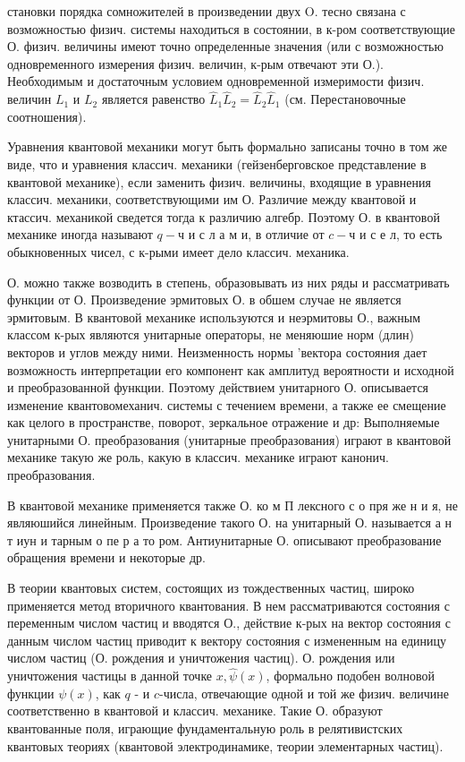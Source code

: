 \documentclass[10pt]{article}
\begin{document}
становки порядка сомножителей в произведении двух $\mathrm{O}$. тесно связана с возможностью физич. системы находиться в состоянии, в к-ром соответствующие О. физич. величины имеют точно определенные значения (или с возможностью одновременного измерения физич. величин, к-рым отвечают эти О.). Необходимым и достаточным условием одновременной измеримости физич. величин $L_{1}$ и $L_{2}$ является равенство $\hat{L}_{1} \hat{L}_{2}=\hat{L}_{2} \hat{L}_{1}$ (см. Перестановочные соотношения).



Уравнения квантовой механики могут быть формально записаны точно в том же виде, что и уравнения классич. механики (гейзенберговское представление в квантовой механике), если заменить физич. величины, входящие в уравнения классич. механики, соответствующими им О. Различие между квантовой и ктассич. механикой сведется тогда к различию алгебр. Поэтому О. в квантовой механике иногда называют $q-ч$ и с л а м и, в отличие от $c-ч$ и с е л, то есть обыкновенных чисел, с к-рыми имеет дело классич. механика.



О. можно также возводить в степень, образовывать из них ряды и рассматривать функции от О. Произведение эрмитовых О. в обшем случае не является эрмитовым. В квантовой механике используются и неэрмитовы О., важным классом к-рых являются унитарные операторы, не меняюшие норм (длин) векторов и углов между ними. Неизменность нормы 'вектора состояния дает возможность интерпретации его компонент как амплитуд вероятности и исходной и преобразованной функции. Поэтому действием унитарного О. описывается изменение квантовомеханич. системы с течением времени, а также ее смещение как целого в пространстве, поворот, зеркальное отражение и др: Выполняемые унитарными О. преобразования (унитарные преобразования) играют в квантовой механике такую же роль, какую в классич. механике играют канонич. преобразования.



В квантовой механике применяется также О. ко м П лексного с о пря же н и я, не являюшийся линейным. Произведение такого О. на унитарный О. называется а н т иун и тарным о пе р а то ром. Антиунитарные О. описывают преобразование обращения времени и некоторые др.



В теории квантовых систем, состоящих из тождественных частиц, широко применяется метод вторичного квантования. В нем рассматриваются состояния с переменным числом частиц и вводятся О., действие к-рых на вектор состояния с данным числом частиц приводит к вектору состояния с измененным на единицу числом частиц (О. рождения и уничтожения частиц). О. рождения или уничтожения частицы в данной точке $x, \hat{\psi}(x)$, формально подобен волновой функции $\psi(x)$, как $q$ - и $c$-числа, отвечающие одной и той же физич. величине соответственно в квантовой и классич. механике. Такие О. образуют квантованные поля, играющие фундаментальную роль в релятивистских квантовых теориях (квантовой электродинамике, теории элементарных частиц).
\end{document}
